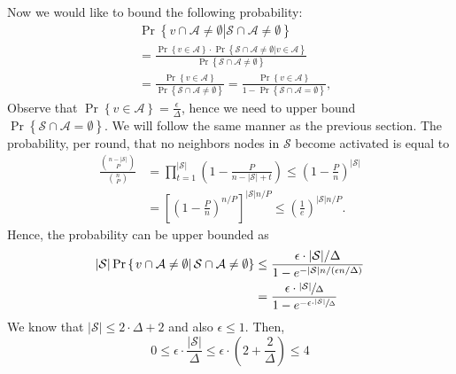 \documentclass{article} %
\begin{document}
Now we would like to bound the following probability:
\begin{align*}
&\Pr\left\{
\left.v \cap \mathcal{A} \neq\emptyset\right|  \mathcal{S}\cap\mathcal{A} \neq\emptyset
\right\} \\
&= \frac{\Pr\left\{v\in\mathcal{A}\right\}\cdot \Pr\left\{\mathcal{S}\cap\mathcal{A} \neq\emptyset \left|v\in\mathcal{A} \right.\right\}}{\Pr\left\{\mathcal{S}\cap\mathcal{A} \neq\emptyset \right\}}\\
&= \frac{\Pr\left\{v\in\mathcal{A}\right\}}{\Pr\left\{\mathcal{S}\cap\mathcal{A} \neq\emptyset \right\}}=\frac{\Pr\left\{v\in\mathcal{A}\right\}}{1-\Pr\left\{\mathcal{S}\cap\mathcal{A} =\emptyset\right\}},
\end{align*}
Observe that 
$\Pr\left\{v\in\mathcal{A}\right\} = \frac{\epsilon}{\Delta}$, hence we need to upper bound $\Pr\left\{\mathcal{S}\cap\mathcal{A} =\emptyset\right\}$.
We will follow the same manner as the previous section.
The probability, per round, that no neighbors nodes in $\mathcal{S}$ become activated is equal to
\begin{align*}
\frac{{n-|\mathcal{S}|\choose P}}{{n\choose P}}
&= \prod_{t=1}^{|\mathcal{S}|}\left(1- \frac{P}{n-|\mathcal{S}|+t}\right)\le \left(1- \frac{P}{n}\right)^{|\mathcal{S}|}\\
&
= \left[\left(1- \frac{P}{n}\right)^{n/P}\right]^{|\mathcal{S}|n/P}
\le \left(\frac{1}{e}\right)^{|\mathcal{S}|n/P}.
\end{align*}
Hence, the probability can be upper bounded as
\begin{align*}
|\mathcal{S}|\Pr\left\{
\left.v \cap \mathcal{A} \neq\emptyset\right|  \mathcal{S}\cap\mathcal{A} \neq\emptyset
\right\} 
&\le \frac{\epsilon\cdot |\mathcal{S}|/\Delta}{1-e^{-|\mathcal{S}|n/(\epsilon n/\Delta)}}\\
&= \frac{\epsilon\cdot \sfrac{|\mathcal{S}|}{\Delta}}{1-e^{-\epsilon\cdot \sfrac{|\mathcal{S}|}{\Delta}}}
\end{align*}
We know that $|\mathcal{S}|\le 2\cdot\Delta+2$ and also $\epsilon\le 1$.
Then, 
$$0\le \epsilon\cdot \frac{|\mathcal{S}|}{\Delta}\le\epsilon\cdot \left(2+\frac{2}{\Delta}\right)\le 4 $$
\end{document}
